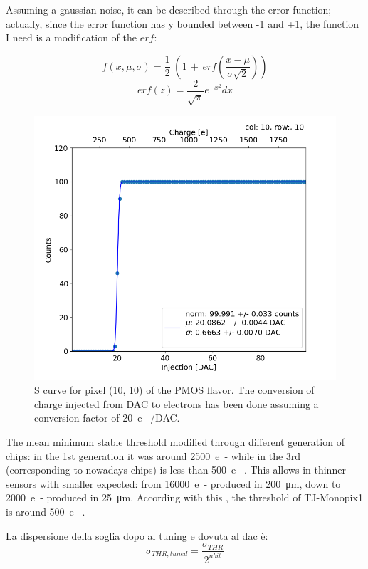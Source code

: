         Assuming a gaussian noise, it can be described through the error function; actually, since the error function has y bounded between -1 and +1, the function I need is a modification of the $erf$: 
        
        \begin{equation}
            f(x, \mu, \sigma) = \frac{1}{2} \; \left(1\,+\,erf\left(\frac{x-\mu}{\sigma \sqrt{2}}\right)\right)
        \end{equation}
        \begin{equation}
            erf(z) = \frac{2}{\sqrt{\pi}} e^{-x^2} dx 
        \end{equation}   
            
    
        \begin{figure}[h!]
            \centering
            \includegraphics[width=.6\linewidth]{figures/charaterization/scurve.png}
            \caption{S curve for pixel (10, 10) of the PMOS flavor. The conversion of charge injected from DAC to electrons has been done assuming a conversion factor of \SI{20}{e-/DAC}.}
            \label{fig:scurve}
        \end{figure}   

        The mean minimum stable threshold modified through different generation of chips: in the 1st generation it was around \SI{2500}{e-} while in the 3rd (corresponding to nowadays chips) is less than \SI{500}{e-}. This allows in thinner sensors with smaller expected: from \SI{16000}{e-} produced in \SI{200}{\um}, down to \SI{2000}{e-} produced in \SI{25}{\um}. According with this , the threshold of TJ-Monopix1 is around \SI{500}{e-}.
        
        
        La dispersione della soglia dopo al tuning e dovuta al dac è: 
        \begin{equation}
            \sigma_{THR, tuned} = \frac{\sigma_{THR}}{2^{n bit}}
        \end{equation}



